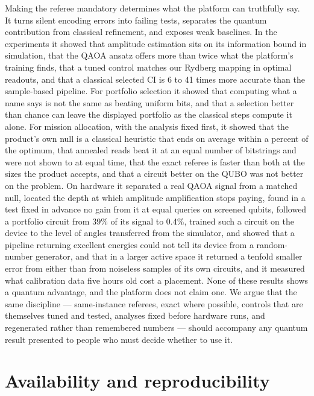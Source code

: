 \documentclass[11pt,a4paper]{article}
\begin{document}
Making the referee mandatory determines what the platform can truthfully
say. It turns silent encoding errors
into failing tests, separates the quantum contribution from classical
refinement, and exposes weak baselines. In the experiments it
showed that amplitude estimation sits on its information bound in
simulation, that the QAOA ansatz offers more than twice what the platform's
training finds, that a tuned control matches our Rydberg mapping in optimal
readouts, and that a classical selected CI is 6 to 41 times more accurate
than the sample-based pipeline. For portfolio selection it showed that
computing what a name says is not the
same as beating uniform bits, and that a selection better than chance can
leave the displayed portfolio as the classical steps compute it alone.
For mission allocation, with the analysis fixed first, it
showed that the product's own null is a classical heuristic that ends on
average within a percent of the optimum, that annealed reads beat it at an
equal number of bitstrings and were not shown to at equal time, that the
exact referee is faster than both at the sizes the product accepts,
and that a circuit better on the QUBO was not better on the problem. On
hardware it separated a real
QAOA signal from a matched null, located the depth at which amplitude
amplification stops paying, found in a test fixed in advance no gain from
it at equal queries on screened qubits, followed a portfolio circuit from
39\% of its
signal to 0.4\%, trained such a circuit on the device to the level of
angles transferred from the simulator, and showed that a pipeline returning excellent
energies could not tell its device from a random-number generator, and
that in a larger active space it returned a tenfold smaller error from
either than from noiseless samples of its own circuits, and it measured
what calibration data five hours old cost a placement. None of
these results shows a quantum advantage, and the platform does not claim
one. We argue that the same discipline --- same-instance referees, exact
where possible, controls that are themselves tuned and tested, analyses
fixed before hardware runs, and regenerated rather than remembered numbers
--- should accompany any quantum result presented to people who must decide
whether to use it.

\section*{Availability and reproducibility}
\end{document}
